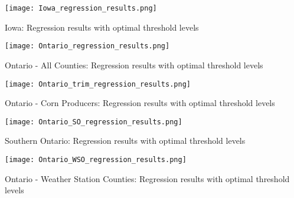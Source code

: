\begin{table}[H]
    \centering
    \texttt{[image: Iowa\_regression\_results.png]}
    \caption{Iowa: Regression results with optimal threshold levels}
    \label{fig:my_label}
\end{table}

\begin{table}[H]
    \centering
    \texttt{[image: Ontario\_regression\_results.png]}
    \caption{Ontario - All Counties: Regression results with optimal threshold levels}
    \label{fig:my_label}
\end{table}

\begin{table}[H]
    \centering
    \texttt{[image: Ontario\_trim\_regression\_results.png]}
    \caption{Ontario - Corn Producers: Regression results with optimal threshold levels}
    \label{fig:my_label}
\end{table}


\begin{table}[H]
    \centering
    \texttt{[image: Ontario\_SO\_regression\_results.png]}
    \caption{Southern Ontario: Regression results with optimal threshold levels}
    \label{fig:my_label}
\end{table}


\begin{table}[H]
    \centering
    \texttt{[image: Ontario\_WSO\_regression\_results.png]}
    \caption{Ontario - Weather Station Counties: Regression results with optimal threshold levels}
    \label{fig:my_label}
\end{table}

